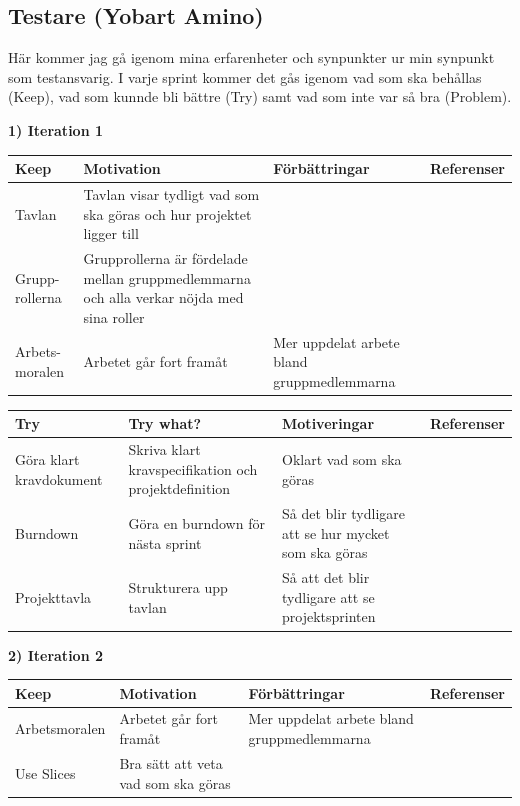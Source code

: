 \documentclass[conference,a4paper]{IEEEtran}
\newcommand\Tstrut{\rule{0pt}{2.6ex}}       %
\newcommand\Bstrut{\rule[-0.9ex]{0pt}{0pt}} %
\newcommand{\TBstrut}{\Tstrut\Bstrut} %
\begin{document}
\subsection{Testare (Yobart Amino)}
Här kommer jag gå igenom mina erfarenheter och synpunkter ur min synpunkt som testansvarig. I varje sprint kommer det gås igenom vad som ska behållas (Keep), vad som kunnde bli bättre (Try) samt vad som inte var så bra (Problem).

\textbf{1) Iteration 1}


\begin{table}[H]
	\small
  \centering
	\begin{tabular}{|p{1.5cm}|p{2cm}|p{1.8cm}|p{1.5cm}|} %
    \hline
    Keep & Motivation & Förbättringar & Referenser \TBstrut \\
    \hline
    Tavlan & Tavlan visar tydligt vad som ska göras och hur projektet ligger till &  &\TBstrut \\
    \hline
    Grupp-rollerna & Grupprollerna är fördelade mellan gruppmedlemmarna och alla verkar nöjda med sina roller &  & \TBstrut \\
    \hline
    Arbets-moralen & Arbetet går fort framåt & Mer uppdelat arbete bland gruppmedlemmarna & \TBstrut \\
    \hline
  \end{tabular}
\end{table}

\begin{table}[H]
	\small
  \centering
	\begin{tabular}{|p{1.5cm}|p{2cm}|p{1.8cm}|p{1.5cm}|} %
    \hline
    Try & Try what? & Motiveringar & Referenser \TBstrut \\
    \hline
    Göra klart kravdokument & Skriva klart kravspecifikation och projektdefinition & Oklart vad som ska göras & \TBstrut \\
    \hline
    Burndown & Göra en burndown för nästa sprint & Så det blir tydligare att se hur mycket som ska göras &\TBstrut \\
    \hline
    Projekttavla & Strukturera upp tavlan & Så att det blir tydligare att se projektsprinten & \TBstrut \\
    \hline
  \end{tabular}
\end{table}

\textbf{2) Iteration 2}

\begin{table}[H]
	\small
  \centering
	\begin{tabular}{|p{1.5cm}|p{2cm}|p{1.8cm}|p{1.5cm}|} %
    \hline
    Keep & Motivation & Förbättringar & Referenser \TBstrut \\
    \hline
    Arbetsmoralen & Arbetet går fort framåt & Mer uppdelat arbete bland gruppmedlemmarna &\TBstrut \\
    \hline
    Use Slices & Bra sätt att veta vad som ska göras &  & \TBstrut \\
    \hline
  \end{tabular}
\end{table}
\end{document}
